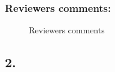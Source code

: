\subsubsection{Reviewers comments:}
\begin{figure}[!h]
\centering
\setlength\fboxsep{0pt}
\setlength\fboxrule{0.5pt}
\caption{Reviewers comments}
\label{fig:RC1}
\end{figure}

\newpage
\subsection*{2.}


